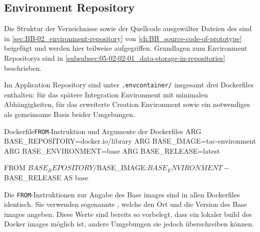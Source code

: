 
\subsection{Environment Repository}
\label{subsec:06-02-02_environment-repository}

Die Struktur der Verzeichnisse sowie der Quellcode ausgewälter Dateien des  sind in \autoref{sec:BB-02_environment-repository} von \autoref{ch:BB_source-code-of-prototype} beigefügt und werden hier teilweise aufgegriffen. Grundlagen zum Environment Repositorys sind in \autoref{subsubsec:05-02-02-01_data-storage-in-repositories} beschrieben.

Im Application Repository sind unter \texttt{.envcontainer/} insgesamt drei Dockerfiles enthalten:  für das spätere Integration Environment mit minimalen Abhängigkeiten,  für das erweiterte Creation Environment sowie ein notwendiges  als gemeinsame Basis beider Umgebungen.

\begin{codebox}{Dockerfile}{\texttt{FROM}-Instruktion und Argumente der Dockerfiles}
ARG BASE_REPOSITORY=docker.io/library
ARG BASE_IMAGE=tac-environment
ARG BASE_ENVIRONMENT=base
ARG BASE_RELEASE=latest

FROM ${BASE_REPOSITORY}/${BASE_IMAGE}:${BASE_ENVIRONMENT}-${BASE_RELEASE} AS base
\end{codebox}

Die \texttt{FROM}-Instruktionen zur Angabe des Base \Glspl{image} sind in allen Dockerfiles identisch. Sie verwenden sogenannte , welche den Ort und die Version des Base \Glspl{image} angeben. Diese Werte sind bereits so vorbelegt, dass ein lokaler \Gls{build} des Docker \Glspl{image} möglich ist, andere Umgebungen sie jedoch überschreiben können.

